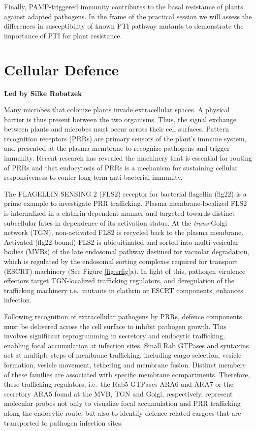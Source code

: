 \documentclass[12pt,]{book}
\theoremstyle{definition}
\theoremstyle{definition}
\theoremstyle{remark}
\begin{document}
Finally, PAMP-triggered immunity contributes to the basal resistance of
plants against adapted pathogens. In the frame of the practical session
we will assess the differences in susceptibility of known PTI pathway
mutants to demonstrate the importance of PTI for plant resistance.

\chapter*{Cellular Defence}\label{cellular-defence}

\textbf{Led by Silke Robatzek}

Many microbes that colonize plants invade extracellular spaces. A
physical barrier is thus present between the two organisms. Thus, the
signal exchange between plants and microbes must occur across their cell
surfaces. Pattern recognition receptors (PRRs) are primary sensors of
the plant's immune system, and presented at the plasma membrane to
recognize pathogens and trigger immunity. Recent research has revealed
the machinery that is essential for routing of PRRs and that endocytosis
of PRRs is a mechanism for sustaining cellular responsiveness to confer
long-term anti-bacterial immunity.

The FLAGELLIN SENSING 2 (FLS2) receptor for bacterial flagellin (flg22)
is a prime example to investigate PRR trafficking. Plasma
membrane-localized FLS2 is internalized in a clathrin-dependent manner
and targeted towards distinct subcellular fates in dependence of its
activation status. At the \emph{trans}-Golgi network (TGN),
non-activated FLS2 is recycled back to the plasma membrane. Activated
(flg22-bound) FLS2 is ubiquitinated and sorted into multi-vesicular
bodies (MVBs) of the late endosomal pathway destined for vacuolar
degradation, which is regulated by the endosomal sorting complexes
required for transport (ESCRT) machinery (See Figure \ref{fig:srfig}a).
In light of this, pathogen virulence effectors target TGN-localized
trafficking regulators, and deregulation of the trafficking machinery
i.e.~mutants in clathrin or ESCRT components, enhances infection.

Following recognition of extracellular pathogens by PRRs, defence
components must be delivered across the cell surface to inhibit pathogen
growth. This involves significant reprogramming in secretory and
endocytic trafficking, enabling focal accumulation at infection sites.
Small Rab GTPases and syntaxins act at multiple steps of membrane
trafficking, including cargo selection, vesicle formation, vesicle
movement, tethering and membrane fusion. Distinct members of these
families are associated with specific membrane compartments. Therefore,
these trafficking regulators, i.e.~the Rab5 GTPases ARA6 and ARA7 or the
secretory ARA5 found at the MVB, TGN and Golgi, respectively, represent
molecular probes not only to visualize focal accumulation and PRR
trafficking along the endocytic route, but also to identify
defence-related cargoes that are transported to pathogen infection
sites.
\end{document}
